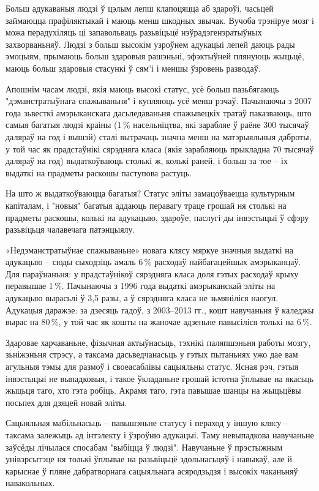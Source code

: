Больш адукаваныя людзі ў цэлым лепш клапоцяцца аб здароўі, часьцей займаюцца прафіляктыкай і маюць менш шкодных звычак. Вучоба трэніруе мозг і можа перадухіляць ці запавольваць разьвіцьцё нэўрадэгенэратыўных захворваньняў. Людзі з больш высокім узроўнем адукацыі лепей даюць рады эмоцыям, прымаюць больш здаровыя рашэньні, эфэктыўней плянуюць жыцьцё, маюць больш здаровыя стасункі ў сям'і і меншы ўзровень разводаў.

Апошнім часам людзі, якія маюць высокі статус, усё больш пазьбягаюць "дэманстратыўнага спажываньня" і купляюць усё менш рэчаў. Пачынаючы з 2007 года зьвесткі амэрыканскага дасьледаваньня спажывецкіх тратаў паказваюць, што самыя багатыя людзі краіны (1\,\% насельніцтва, які зарабляе ў раёне 300 тысячаў даляраў на год і вышэй) сталі вытрачаць значна менш на матэрыяльныя даброты, у той час як прадстаўнікі сярэдняга класа (якія зарабляюць прыкладна 70 тысячаў даляраў на год) выдаткоўваюць столькі ж, колькі раней, і больш за тое – іх выдаткі на прадметы раскошы паступова растуць.

На што ж выдаткоўваюцца багатыя? Статус эліты замацоўваецца культурным капіталам, і "новыя" багатыя аддаюць перавагу траце грошай ня столькі на прадметы раскошы, колькі на адукацыю, здароўе, паслугі ды інвэстыцыі ў сфэру разьвіцьця чалавечага патэнцыялу.

«Недэманстратыўнае спажываньне» новага клясу мяркуе значныя выдаткі на адукацыю – сюды сыходзіць амаль 6\,\% расходаў найбагацейшых амэрыканцаў. Для параўнаньня: у прадстаўнікоў сярэдняга класа доля гэтых расходаў крыху перавышае 1\,\%. Пачынаючы з 1996 года выдаткі амэрыканскай эліты на адукацыю вырасьлі ў 3,5 разы, а ў сярэдняга класа не зьмяніліся наогул. Адукацыя даражэе: за дзесяць гадоў, з 2003--2013 гг., кошт навучаньня ў каледжы вырас на 80\,\%, у той час як кошты на жаночае адзеньне павысіліся толькі на 6\,\%.

Здаровае харчаваньне, фізычная актыўнасьць, тэхнікі паляпшэньня работы мозгу, зьніжэньня стрэсу, а таксама дасьведчанасьць у гэтых пытаньнях ужо дае вам агульныя тэмы для размоў і своеасаблівы сацыяльны статус. Ясная рэч, гэтыя інвэстыцыі не выпадковыя, і такое ўкладаньне грошай істотна ўплывае на якасьць жыцьця таго, хто гэта робіць. Акрамя таго, гэта павышае шанцы на жыцьцёвы посьпех для дзяцей новай эліты.

Сацыяльная мабільнасьць – павышэньне статусу і пераход у іншую клясу – таксама залежыць ад інтэлекту і ўзроўню адукацыі. Таму невыпадкова навучаньне заўсёды лічылася спосабам "выбіцца ў людзі". Навучаньне ў прэстыжным унівэрсытэце ня толькі ўплывае на разьвіцьцё здольнасьцяў і навыкаў, але й карыснае ў пляне дабратворнага сацыяльнага асяродзьдзя і высокіх чаканьняў навакольных.

